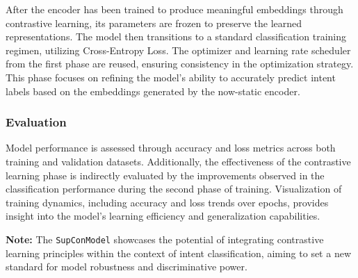 After the encoder has been trained to produce meaningful embeddings through contrastive learning, its parameters are frozen to preserve the learned representations. The model then transitions to a standard classification training regimen, utilizing Cross-Entropy Loss. The optimizer and learning rate scheduler from the first phase are reused, ensuring consistency in the optimization strategy. This phase focuses on refining the model's ability to accurately predict intent labels based on the embeddings generated by the now-static encoder.

\subsubsection*{Evaluation}
Model performance is assessed through accuracy and loss metrics across both training and validation datasets. Additionally, the effectiveness of the contrastive learning phase is indirectly evaluated by the improvements observed in the classification performance during the second phase of training. Visualization of training dynamics, including accuracy and loss trends over epochs, provides insight into the model's learning efficiency and generalization capabilities.

\textbf{Note:} The \texttt{SupConModel} showcases the potential of integrating contrastive learning principles within the context of intent classification, aiming to set a new standard for model robustness and discriminative power.

